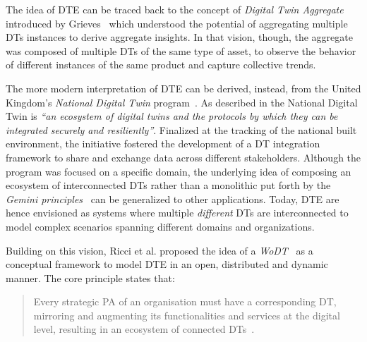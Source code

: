 The idea of \ac{DTE} can be traced back to the concept of \emph{Digital Twin Aggregate} introduced by Grieves~\cite{Grieves_2023} which understood the potential of aggregating multiple \acp{DT} instances to derive aggregate insights.
%
In that vision, though, the aggregate was composed of multiple \acp{DT} of the same type of asset, to observe the behavior of different instances of the same product and capture collective trends.

The more modern interpretation of \ac{DTE} can be derived, instead, from the United Kingdom's \textit{National Digital Twin} program~\cite{bulter2018geminiprinciples}.
%
As described in \cite{kendall2021ndt} the National Digital Twin is \emph{``an ecosystem
of digital twins and the protocols by which
they can be integrated securely and
resiliently''}.
%
Finalized at the tracking of the national built environment, the initiative fostered the development of a \ac{DT} integration framework to share and exchange data across different stakeholders.
%
Although the program was focused on a specific domain, the underlying idea of composing an ecosystem of interconnected \acp{DT} rather than a monolithic put forth by the \emph{Gemini principles}~\cite{bulter2018geminiprinciples} can be generalized to other applications.
%
Today, \ac{DTE} are hence envisioned as systems where multiple \emph{different} \acp{DT} are interconnected to model complex scenarios spanning different domains and organizations.

Building on this vision, Ricci et al. proposed the idea of a \emph{\ac{WoDT}}~\cite{web-of-dt-ricci-2022} as a conceptual framework to model \ac{DTE} in an open, distributed and dynamic manner.
The core principle states that:

\begin{quote}
Every strategic \acl{PA} of an organisation must have a corresponding \acl{DT}, mirroring and augmenting its functionalities and services at the digital level, resulting in an ecosystem of connected \aclp{DT}~\cite{web-of-dt-ricci-2022}.
\end{quote}

